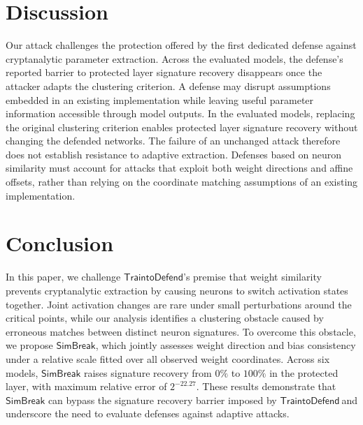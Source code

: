 \documentclass[runningheads]{llncs}
\newcommand{\td}{$\mathsf{Train to Defend}~$}
\newcommand{\nospacetd}{$\mathsf{Train to Defend}$}
\newcommand{\ours}{{$\mathsf{SimBreak}$}\xspace}
\begin{document}
\section{Discussion}
\label{sec:discussion}
Our attack challenges the protection offered by the first dedicated defense against cryptanalytic parameter extraction.
Across the evaluated models, the defense's reported barrier to protected layer signature recovery disappears once the attacker adapts the clustering criterion.
A defense may disrupt assumptions embedded in an existing implementation while leaving useful parameter information accessible through model outputs.
In the evaluated models, replacing the original clustering criterion enables protected layer signature recovery without changing the defended networks.
The failure of an unchanged attack therefore does not establish resistance to adaptive extraction.
Defenses based on neuron similarity must account for attacks that exploit both weight directions and affine offsets, rather than relying on the coordinate matching assumptions of an existing implementation.


\section{Conclusion}
\label{sec:conclusion}
In this paper, we challenge \nospacetd's premise that weight similarity prevents cryptanalytic extraction by causing neurons to switch activation states together.
Joint activation changes are rare under small perturbations around the critical points, while our analysis identifies a clustering obstacle caused by erroneous matches between distinct neuron signatures.
To overcome this obstacle, we propose \ours{}, which jointly assesses weight direction and bias consistency under a relative scale fitted over all observed weight coordinates.
Across six models, \ours{} raises signature recovery from $0\%$ to $100\%$ in the protected layer, with maximum relative error of $2^{-22.27}$.
These results demonstrate that \ours{} can bypass the signature recovery barrier imposed by \td and underscore the need to evaluate defenses against adaptive attacks.


% 

\appendix
\end{document}
